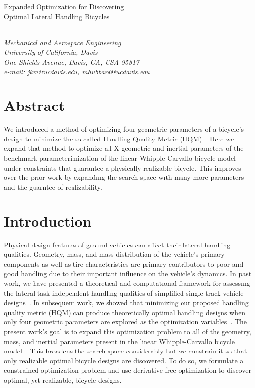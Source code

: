 \documentclass{bmd2019a}
\begin{document}
\begin{flushleft}
{\fontsize{16pt}{20pt}\selectfont%
  Expanded Optimization for Discovering\\}
{\fontsize{16pt}{20pt}\selectfont%
  Optimal Lateral Handling Bicycles}
\end{flushleft}

\begin{flushleft}
  {\\}
  \textit{Mechanical and Aerospace Engineering\\
          University of California, Davis\\
          One Shields Avenue, Davis, CA, USA 95817\\
          e-mail: jkm@ucdavis.edu, mhubbard@ucdavis.edu}
\end{flushleft}


\section*{Abstract}
%
We introduced a method of optimizing four geometric parameters of a bicycle's
design to minimize the so called Handling Quality Metric
(HQM)~\cite{Moore2016}. Here we expand that method to optimize all X geometric
and inertial parameters of the benchmark parameterimization of the linear
Whipple-Carvallo bicycle model under constraints that guarantee a physically
realizable bicycle. This improves over the prior work by expanding the search
space with many more parameters and the guarntee of realizability.

\section{Introduction}
%
Physical design features of ground vehicles can affect their lateral handling
qualities. Geometry, mass, and mass distribution of the vehicle's primary
components as well as tire characteristics are primary contributors to poor and
good handling due to their important influence on the vehicle's dynamics. In
past work, we have presented a theoretical and computational framework for
assessing the lateral task-independent handling qualities of simplified single
track vehicle designs~\cite{Hess2012,Moore2012}. In subsequent work, we showed
that minimizing our proposed handling quality metric (HQM) can produce theoretically
optimal handling designs when only four geometric parameters are explored as
the optimization variables~\cite{Moore2016}. The present work's goal is to
expand this optimization problem to all of the geometry, mass, and inertial
parameters present in the linear Whipple-Carvallo bicycle model~\cite{Meijaard2007}.
This broadens the search space considerably but we constrain it so that only
realizable optimal bicycle designs are discovered. To do so, we formulate a
constrained optimization problem and use derivative-free optimization to
discover optimal, yet realizable, bicycle designs.
\end{document}
